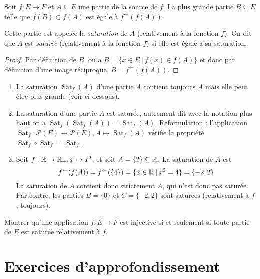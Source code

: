 \begin{propdef}
Soit $f : E\to F$ et $A \subseteq E$ une partie de la source de $f$. La plus grande partie $B\subseteq E$ telle que $f(B) \subset f(A)$ est égale à $f^\leftarrow(f(A))$.

Cette partie est appelée la \emph{saturation} de $A$ (relativement à la fonction $f$). On dit que $A$ est \emph{saturée} (relativement à la fonction $f$) si elle est égale à sa saturation.
\end{propdef}
\begin{proof}
Par définition de $B$, on a $B = \{x\in E\:|\: f(x)\in f(A) \}$ et donc par définition d'une image réciproque, $B = f^\leftarrow(f(A))$.
\end{proof}

\begin{exemple}
\begin{enumerate}
\item La saturation $\operatorname{Sat}_f(A)$ d'une partie $A$ contient toujours $A$ mais elle peut être plus grande (voir ci-dessous).
\item La saturation d'une partie $A$ est saturée, autrement dit avec la notation plus haut  on a  $\operatorname{Sat}_f(\operatorname{Sat}_f(A)) = \operatorname{Sat}_f(A)$. Reformulation : l'application $\operatorname{Sat}_f : \mathcal P(E) \to \mathcal P(E), A\mapsto \operatorname{Sat}_f(A)$ vérifie la propriété $\operatorname{Sat}_f \circ \operatorname{Sat}_f = \operatorname{Sat}_f$.
\item Soit $f : \mathbb{R}\to \mathbb{R}_+, x\mapsto x^2$, et soit $A=\{2\} \subseteq \mathbb{R}$. La saturation de $A$ est 
\[f^\leftarrow(f(A)) = f^\leftarrow(\{4\}) = \{x\in \mathbb{R}\:|\: x^2=4\} = \{-2,2\}
\]
La saturation de $A$ contient donc strictement $A$, qui n'est donc pas saturée. Par contre, les parties $B = \{0\}$ et $C=\{-2,2\}$ sont saturées (relativement à $f$, toujours).
\end{enumerate}
\end{exemple}

\begin{exercice}
Montrer qu'une application $f:E\to F$ est injective si et seulement si toute partie de $E$ est saturée relativement à $f$.
\end{exercice}







\section{Exercices d'approfondissement}

